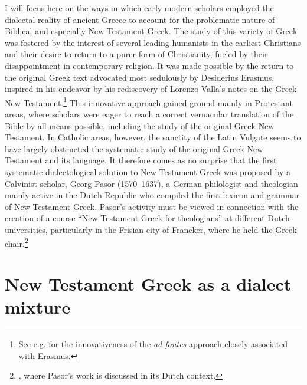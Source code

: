 I will focus here on the ways in which early modern scholars employed the dialectal reality of ancient Greece to account for the problematic nature of Biblical and especially New Testament Greek. The study of this variety of Greek was fostered by the interest of several leading humanists in the earliest Christians and their desire to return to a purer form of Christianity, fueled by their disappointment in contemporary religion. It was made possible by the return to the original Greek text advocated most sedulously by Desiderius Erasmus, inspired in his endeavor by his rediscovery of Lorenzo Valla’s notes on the Greek New Testament.\footnote{See e.g. \citet[esp. 31]{Bentley1983} for the innovativeness of the \textit{ad fontes} approach closely associated with Erasmus.} This innovative approach gained ground mainly in Protestant areas, where scholars were eager to reach a correct vernacular translation of the Bible by all means possible, including the study of the original Greek New Testament. In Catholic areas, however, the sanctity of the Latin Vulgate seems to have largely obstructed the systematic study of the original Greek New Testament and its language. It therefore comes as no surprise that the first systematic dialectological solution to New Testament Greek was proposed by a Calvinist scholar, Georg Pasor (1570–1637), a German philologist and theologian mainly active in the Dutch Republic who compiled the first lexicon and grammar of New Testament Greek. Pasor’s activity must be viewed in connection with the creation of a course “New Testament Greek for theologians” at different Dutch universities, particularly in the Frisian city of Franeker, where he held the Greek chair.\footnote{, where Pasor’s work is discussed in its Dutch context.}

\section{New Testament Greek as a dialect mixture}\label{sec:4.5}


